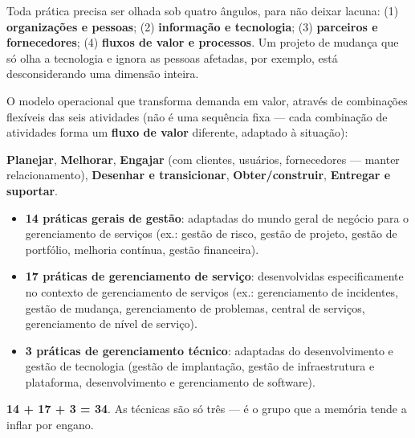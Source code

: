 \begin{conceito}[4 dimensões]
Toda prática precisa ser olhada sob quatro ângulos, para não deixar lacuna:
(1) \textbf{organizações e pessoas}; (2) \textbf{informação e tecnologia};
(3) \textbf{parceiros e fornecedores}; (4) \textbf{fluxos de valor e
processos}. Um projeto de mudança que só olha a tecnologia e ignora as
pessoas afetadas, por exemplo, está desconsiderando uma dimensão inteira.
\end{conceito}

\begin{conceito}
O modelo operacional que transforma demanda em valor, através de
combinações flexíveis das seis atividades (não é uma sequência fixa --- cada
combinação de atividades forma um \textbf{fluxo de valor} diferente,
adaptado à situação):

\textbf{Planejar}, \textbf{Melhorar}, \textbf{Engajar} (com clientes,
usuários, fornecedores --- manter relacionamento), \textbf{Desenhar e
transicionar}, \textbf{Obter/construir}, \textbf{Entregar e suportar}.
\end{conceito}

\begin{conceito}
\begin{itemize}
\item \textbf{14 práticas gerais de gestão}: adaptadas do mundo geral de
negócio para o gerenciamento de serviços (ex.: gestão de risco, gestão de
projeto, gestão de portfólio, melhoria contínua, gestão financeira).
\item \textbf{17 práticas de gerenciamento de serviço}: desenvolvidas
especificamente no contexto de gerenciamento de serviços (ex.:
gerenciamento de incidentes, gestão de mudança, gerenciamento de problemas,
central de serviços, gerenciamento de nível de serviço).
\item \textbf{3 práticas de gerenciamento técnico}: adaptadas do
desenvolvimento e gestão de tecnologia (gestão de implantação, gestão de
infraestrutura e plataforma, desenvolvimento e gerenciamento de software).
\end{itemize}
\textbf{14 + 17 + 3 = 34}. As técnicas são só três --- é o grupo que a
memória tende a inflar por engano.
\end{conceito}


